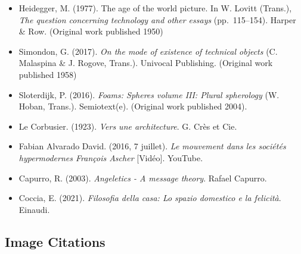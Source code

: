 \documentclass[
  letterpaper,
  DIV=11,
  numbers=noendperiod]{scrreprt}
\begin{document}
\begin{itemize}
  Press. (Original work published ca. 350 B.C.E.)
\item
  Heidegger, M. (1977). The age of the world picture. In W. Lovitt
  (Trans.), \emph{The question concerning technology and other essays}
  (pp.~115--154). Harper \& Row. (Original work published 1950)
\item
  Simondon, G. (2017). \emph{On the mode of existence of technical
  objects} (C. Malaspina \& J. Rogove, Trans.). Univocal Publishing.
  (Original work published 1958)
\item
  Sloterdijk, P. (2016). \emph{Foams: Spheres volume III: Plural
  spherology} (W. Hoban, Trans.). Semiotext(e). (Original work published
  2004).
\item
  Le Corbusier. (1923). \emph{Vers une architecture}. G. Crès et Cie.
\item
  Fabian Alvarado David. (2016, 7 juillet). \emph{Le mouvement dans les
  sociétés hypermodernes François Ascher} {[}Vidéo{]}. YouTube.
\item
  Capurro, R. (2003). \emph{Angeletics - A message theory}. Rafael
  Capurro.
\item
  Coccia, E. (2021). \emph{Filosofia della casa: Lo spazio domestico e
  la felicità}. Einaudi.
\end{itemize}

\subsection{Image Citations}\label{image-citations}
\end{document}
